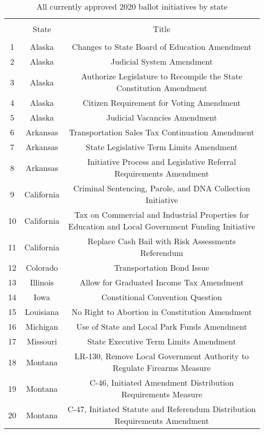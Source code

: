 
\begin{table}[!htbp] \centering 
  \caption{All currently approved 2020 ballot initiatives by state} 
  \label{tab: state_initiatives} 
\scriptsize 
\begin{tabular}{@{\extracolsep{0pt}} ccc} 
\\[-1.8ex]\hline 
\hline \\[-1.8ex] 
 & State & Title \\ 
\hline \\[-1.8ex] 
1 & Alaska & Changes to State Board of Education Amendment \\ 
2 & Alaska & Judicial System Amendment \\ 
3 & Alaska & Authorize Legislature to Recompile the State Constitution Amendment \\ 
4 & Alaska & Citizen Requirement for Voting Amendment \\ 
5 & Alaska & Judicial Vacancies Amendment \\ 
6 & Arkansas & Transportation Sales Tax Continuation Amendment \\ 
7 & Arkansas & State Legislative Term Limits Amendment \\ 
8 & Arkansas & Initiative Process and Legislative Referral Requirements Amendment \\ 
9 & California & Criminal Sentencing, Parole, and DNA Collection Initiative \\ 
10 & California & Tax on Commercial and Industrial Properties for Education and Local Government Funding Initiative \\ 
11 & California & Replace Cash Bail with Risk Assessments Referendum \\ 
12 & Colorado & Transportation Bond Issue \\ 
13 & Illinois & Allow for Graduated Income Tax Amendment \\ 
14 & Iowa & Constitional Convention Question \\ 
15 & Louisiana & No Right to Abortion in Constitution Amendment \\ 
16 & Michigan & Use of State and Local Park Funds Amendment \\ 
17 & Missouri & State Executive Term Limits Amendment \\ 
18 & Montana & LR-130, Remove Local Government Authority to Regulate Firearms Measure \\ 
19 & Montana & C-46, Initiated Amendment Distribution Requirements Measure \\ 
20 & Montana & C-47, Initiated Statute and Referendum Distribution Requirements Amendment \\ 

\end{tabular}
\end{table}
